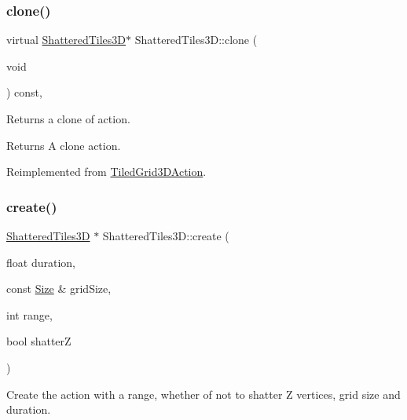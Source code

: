 \subsubsection{\texorpdfstring{clone()}{clone()}\hspace{0.1cm}{\footnotesize\ttfamily [2/2]}}
{\footnotesize\ttfamily virtual \hyperlink{classShatteredTiles3D}{Shattered\+Tiles3D}$\ast$ Shattered\+Tiles3\+D\+::clone (\begin{DoxyParamCaption}\item[{void}]{ }\end{DoxyParamCaption}) const\hspace{0.3cm}{\ttfamily [override]}, {\ttfamily [virtual]}}

Returns a clone of action.

\begin{DoxyReturn}{Returns}
A clone action. 
\end{DoxyReturn}


Reimplemented from \hyperlink{classTiledGrid3DAction_a689fd377cc0abae91db7def106529b53}{Tiled\+Grid3\+D\+Action}.

\mbox{\label{classShatteredTiles3D_ab1298dfa0cf5d8bf89143c9189487e72}} 
\subsubsection{\texorpdfstring{create()}{create()}\hspace{0.1cm}{\footnotesize\ttfamily [1/2]}}
{\footnotesize\ttfamily \hyperlink{classShatteredTiles3D}{Shattered\+Tiles3D} $\ast$ Shattered\+Tiles3\+D\+::create (\begin{DoxyParamCaption}\item[{float}]{duration,  }\item[{const \hyperlink{classSize}{Size} \&}]{grid\+Size,  }\item[{int}]{range,  }\item[{bool}]{shatterZ }\end{DoxyParamCaption})\hspace{0.3cm}{\ttfamily [static]}}



Create the action with a range, whether of not to shatter Z vertices, grid size and duration. 


